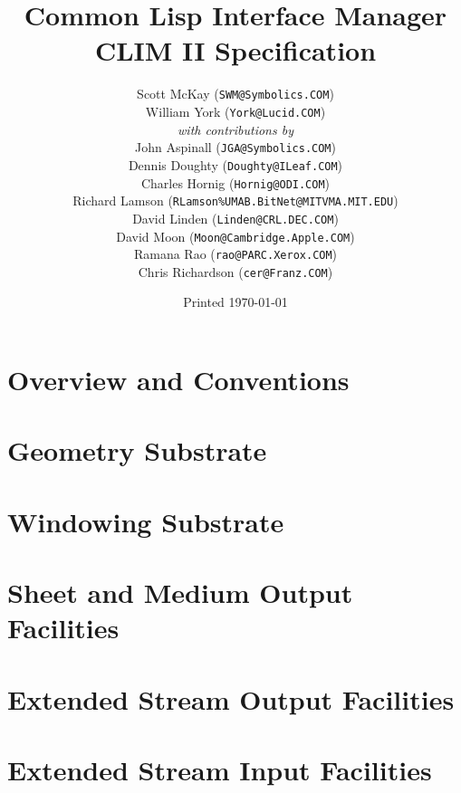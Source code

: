 \documentclass{report}          %
\title{Common Lisp Interface Manager \\
       CLIM II Specification}
\author{Scott McKay ({\tt SWM@Symbolics.COM}) \\
        William York ({\tt York@Lucid.COM}) \\ 
        {\it with contributions by} \\
        {\rm John Aspinall ({\tt JGA@Symbolics.COM})} \\
        {\rm Dennis Doughty ({\tt Doughty@ILeaf.COM})} \\
        {\rm Charles Hornig ({\tt Hornig@ODI.COM})} \\
        {\rm Richard Lamson ({\tt RLamson\%UMAB.BitNet@MITVMA.MIT.EDU})} \\
        {\rm David Linden ({\tt Linden@CRL.DEC.COM})} \\
        {\rm David Moon ({\tt Moon@Cambridge.Apple.COM})} \\
        {\rm Ramana Rao ({\tt rao@PARC.Xerox.COM})} \\
        {\rm Chris Richardson ({\tt cer@Franz.COM})}}
\date{Printed \today}
\begin{document}
\maketitle

\parindent 0pc
\parskip   1pc

\renewcommand{\thepage}{\roman{page}}

\pagebreak
\tableofcontents

\pagebreak


\pagebreak
\setcounter{page}{1}
\renewcommand{\thepage}{\arabic{page}}

\part{Overview and Conventions}



\part{Geometry Substrate}




\part{Windowing Substrate}


\part{Sheet and Medium Output Facilities}






\part{Extended Stream Output Facilities}








\part{Extended Stream Input Facilities}





\end{document}
